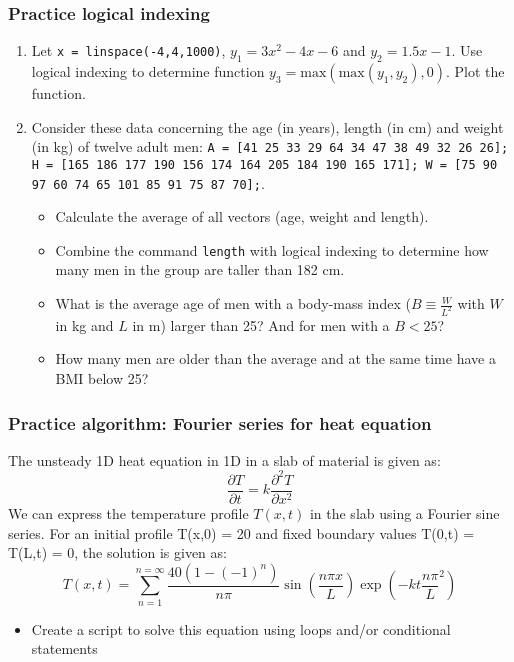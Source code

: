  \begin{frame}[fragile]
  \frametitle{Practice logical indexing}
  \begin{enumerate}
    \item Let \lstinline$x = linspace(-4,4,1000)$, $y_1 = 3x^2 - 4x - 6$ and $y_2 = 1.5x - 1$. Use logical indexing to determine function $y_3 = \mathrm{max}(\mathrm{max}(y_1,y_2),0)$. Plot the function.
    \item Consider these data concerning the age (in years), length (in cm) and weight (in kg) of twelve adult men: \lstinline$A = [41 25 33 29 64 34 47 38 49 32 26 26]; H = [165 186 177 190 156 174 164 205 184 190 165 171]; W = [75 90 97 60 74 65 101 85 91 75 87 70];$.
    \begin{itemize}
      \item Calculate the average of all vectors (age, weight and length).
      \item Combine the command \lstinline$length$ with logical indexing to determine how many men in the group are taller than 182 cm.
      \item What is the average age of men with a body-mass index ($B \equiv \frac{W}{L^2}$ with $W$ in kg and $L$ in m) larger than 25? And for men with a $B<25$?
      \item How many men are older than the average and at the same time have a BMI below 25?
    \end{itemize}
  \end{enumerate}
 \end{frame}

\begin{frame}[fragile]
  \frametitle{Practice algorithm: Fourier series for heat equation}
  The unsteady 1D heat equation in 1D in a slab of material is given as:
  \[
     \frac{\partial T}{\partial t} = k\frac{\partial^2 T}{\partial x^2}
  \]
 We can express the temperature profile $T(x,t)$ in the slab using a Fourier sine series. For an initial profile T(x,0) = 20 and fixed boundary values T(0,t) = T(L,t) = 0, the solution is given as:
  \[
     T(x,t) = \sum_{n=1}^{n=\infty}\frac{40(1-(-1)^n)}{n\pi}  \sin\left(\frac{n\pi x}{L}\right) \exp\left(-kt\frac{n \pi}{L}^2\right)
  \]
  \begin{itemize}
      \item Create a script to solve this equation using loops and/or conditional statements
  \end{itemize}
 \end{frame}
 
 
